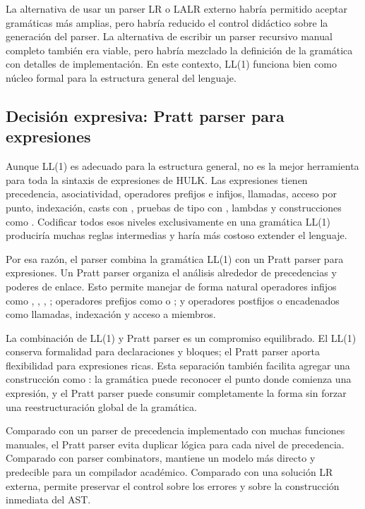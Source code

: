 \documentclass[12pt,letterpaper]{article}
\newcommand{\repo}[1]{\texttt{\detokenize{#1}}}
\newcommand{\hulk}{\textsc{HULK}}
\begin{document}
La alternativa de usar un parser LR o LALR externo habría permitido aceptar gramáticas más amplias, pero habría reducido el control didáctico sobre la generación del parser. La alternativa de escribir un parser recursivo manual completo también era viable, pero habría mezclado la definición de la gramática con detalles de implementación. En este contexto, LL(1) funciona bien como núcleo formal para la estructura general del lenguaje.

\subsection{Decisión expresiva: Pratt parser para expresiones}

Aunque LL(1) es adecuado para la estructura general, no es la mejor herramienta para toda la sintaxis de expresiones de \hulk{}. Las expresiones tienen precedencia, asociatividad, operadores prefijos e infijos, llamadas, acceso por punto, indexación, casts con \repo{as}, pruebas de tipo con \repo{is}, lambdas y construcciones como \repo{match}. Codificar todos esos niveles exclusivamente en una gramática LL(1) produciría muchas reglas intermedias y haría más costoso extender el lenguaje.

Por esa razón, el parser combina la gramática LL(1) con un Pratt parser para expresiones. Un Pratt parser organiza el análisis alrededor de precedencias y poderes de enlace. Esto permite manejar de forma natural operadores infijos como \repo{+}, \repo{*}, \repo{==}, \repo{@}; operadores prefijos como \repo{!} o \repo{-}; y operadores postfijos o encadenados como llamadas, indexación y acceso a miembros.

La combinación de LL(1) y Pratt parser es un compromiso equilibrado. El LL(1) conserva formalidad para declaraciones y bloques; el Pratt parser aporta flexibilidad para expresiones ricas. Esta separación también facilita agregar una construcción como \repo{match}: la gramática puede reconocer el punto donde comienza una expresión, y el Pratt parser puede consumir completamente la forma \repo{match (scrutinee) { pattern => body, ... }} sin forzar una reestructuración global de la gramática.

Comparado con un parser de precedencia implementado con muchas funciones manuales, el Pratt parser evita duplicar lógica para cada nivel de precedencia. Comparado con parser combinators, mantiene un modelo más directo y predecible para un compilador académico. Comparado con una solución LR externa, permite preservar el control sobre los errores y sobre la construcción inmediata del AST.
\end{document}
